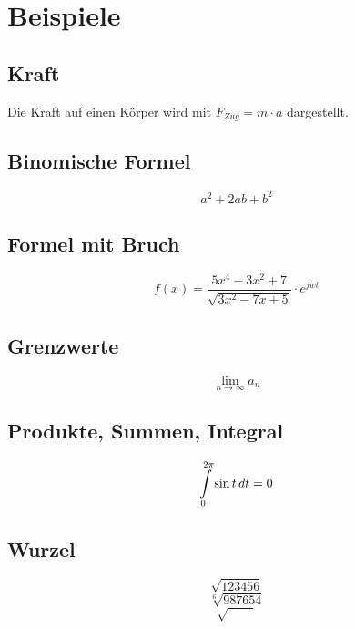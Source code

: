 \section{Beispiele}

\subsection{Kraft}
Die Kraft auf einen Körper wird mit $F_{Zug}=m \cdot a$ dargestellt.

\subsection{Binomische Formel}
\begin{equation}
a^2+2ab+b^2
\end{equation}

\subsection{Formel mit Bruch}
\begin{equation}
f(x) = \frac{5x^4-3x^2+7}{\sqrt{3x^2-7x+5}} \cdot e^{jwt}
\end{equation}

\subsection{Grenzwerte}
\begin{equation}
\lim\limits_{n \rightarrow \infty}{a_n}
\end{equation}

\subsection{Produkte, Summen, Integral}
\begin{equation}
\int_0^{2\pi} \limits \sin t\,dt=0
\end{equation}

\subsection{Wurzel}
\begin{equation}
\sqrt{123456}
\end{equation}
\begin{equation}
\sqrt[6]{987654}
\end{equation}
\begin{equation}
\sqrt{\qquad}
\end{equation}
